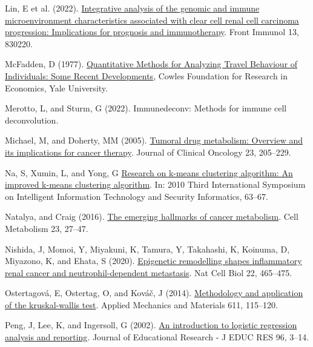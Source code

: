 \documentclass[
  parskip,
  oneside]{scrreprt}
\newlength{\cslhangindent}
\newlength{\cslentryspacingunit} %
\newenvironment{CSLReferences}[2] %
 {%
  \setlength{\parindent}{0pt}
  \ifodd #1
  \let\oldpar\par
  \def\par{\hangindent=\cslhangindent\oldpar}
  \fi
  \setlength{\parskip}{#2\cslentryspacingunit}
 }%
 {}
\begin{document}
\begin{CSLReferences}{0}{0}
\leavevmode{}%
Lin, E et al. (2022).
\href{https://doi.org/10.3389/fimmu.2022.830220}{Integrative analysis of
the genomic and immune microenvironment characteristics associated with
clear cell renal cell carcinoma progression: Implications for prognosis
and immunotherapy}. Front Immunol 13, 830220.

\leavevmode{}%
McFadden, D (1977). \href{}{{Quantitative Methods for Analyzing Travel
Behaviour of Individuals: Some Recent Developments}}, Cowles Foundation
for Research in Economics, Yale University.

\leavevmode{}%
Merotto, L, and Sturm, G (2022). Immunedeconv: Methods for immune cell
deconvolution.

\leavevmode{}%
Michael, M, and Doherty, MM (2005).
\href{https://doi.org/10.1200/jco.2005.02.120}{Tumoral drug metabolism:
Overview and its implications for cancer therapy}. Journal of Clinical
Oncology 23, 205--229.

\leavevmode{}%
Na, S, Xumin, L, and Yong, G
\href{https://doi.org/10.1109/IITSI.2010.74}{Research on k-means
clustering algorithm: An improved k-means clustering algorithm}. In:
2010 Third International Symposium on Intelligent Information Technology
and Security Informatics, 63--67.

\leavevmode{}%
Natalya, and Craig (2016).
\href{https://doi.org/10.1016/j.cmet.2015.12.006}{The emerging hallmarks
of cancer metabolism}. Cell Metabolism 23, 27--47.

\leavevmode{}%
Nishida, J, Momoi, Y, Miyakuni, K, Tamura, Y, Takahashi, K, Koinuma, D,
Miyazono, K, and Ehata, S (2020).
\href{https://doi.org/10.1038/s41556-020-0491-2}{Epigenetic remodelling
shapes inflammatory renal cancer and neutrophil-dependent metastasis}.
Nat Cell Biol 22, 465--475.

\leavevmode{}%
Ostertagová, E, Ostertag, O, and Kováč, J (2014).
\href{https://doi.org/10.4028/www.scientific.net/AMM.611.115}{Methodology
and application of the kruskal-wallis test}. Applied Mechanics and
Materials 611, 115--120.

\leavevmode{}%
Peng, J, Lee, K, and Ingersoll, G (2002).
\href{https://doi.org/10.1080/00220670209598786}{An introduction to
logistic regression analysis and reporting}. Journal of Educational
Research - J EDUC RES 96, 3--14.


\end{CSLReferences}
\end{document}
